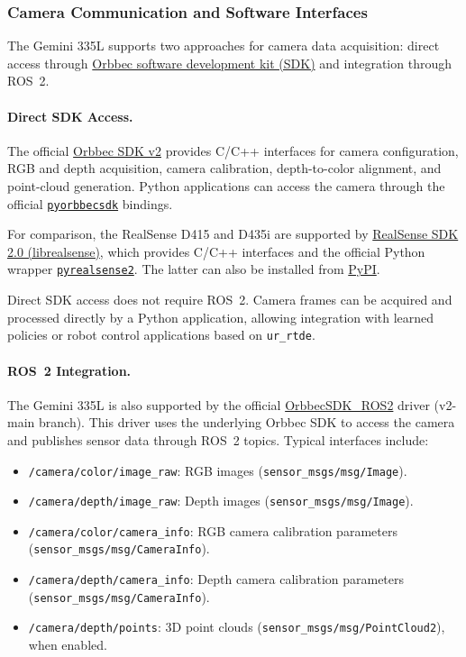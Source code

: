 \documentclass[11pt,a4paper]{article}
\begin{document}
\subsubsection{Camera Communication and Software Interfaces}

The Gemini 335L supports two approaches for camera data acquisition: direct access through  \href{http://www.orbbec.com/developers/orbbec-sdk}{Orbbec software development kit (SDK)}
and integration through ROS~2.

\paragraph{Direct SDK Access.}

The official \href{https://github.com/orbbec/OrbbecSDK_v2}{Orbbec SDK v2} provides C/C++ interfaces for camera configuration, RGB and depth acquisition, camera calibration, depth-to-color alignment, and point-cloud generation. Python applications can access the camera through the official \href{https://github.com/orbbec/pyorbbecsdk/tree/v2-main}{\texttt{pyorbbecsdk}} bindings.

For comparison, the RealSense D415 and D435i are supported by \href{https://github.com/realsenseai/librealsense}{RealSense SDK 2.0 (librealsense)}, which provides C/C++ interfaces and the official Python wrapper \href{https://github.com/realsenseai/librealsense/tree/master/wrappers/python}{\texttt{pyrealsense2}}. The latter can also be installed from \href{https://pypi.org/project/pyrealsense2/}{PyPI}.

Direct SDK access does not require ROS~2. Camera frames can be acquired and processed directly by a Python application, allowing integration with learned policies or robot control applications based on \texttt{ur\_rtde}.

\paragraph{ROS~2 Integration.}

The Gemini 335L is also supported by the official \href{https://github.com/orbbec/OrbbecSDK_ROS2}{OrbbecSDK\_ROS2} driver (v2-main branch). This driver uses the underlying Orbbec SDK to access the camera and publishes sensor data through ROS~2 topics. Typical interfaces include:

\begin{itemize}
    \item \texttt{/camera/color/image\_raw}: RGB images (\texttt{sensor\_msgs/msg/Image}).
    \item \texttt{/camera/depth/image\_raw}: Depth images (\texttt{sensor\_msgs/msg/Image}).
    \item \texttt{/camera/color/camera\_info}: RGB camera calibration parameters (\texttt{sensor\_msgs/msg/CameraInfo}).
    \item \texttt{/camera/depth/camera\_info}: Depth camera calibration parameters (\texttt{sensor\_msgs/msg/CameraInfo}).
    \item \texttt{/camera/depth/points}: 3D point clouds (\texttt{sensor\_msgs/msg/PointCloud2}), when enabled.
\end{itemize}
\end{document}
